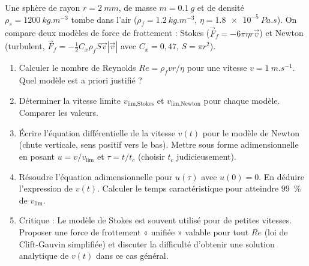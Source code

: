\documentclass[11pt]{article}
\begin{document}
\begin{exercice}
Une sphère de rayon $r = \SI{2}{mm}$, de masse $m = \SI{0,1}{g}$ et de densité $\rho_s = \SI{1200}{kg.m^{-3}}$ tombe dans l'air ($\rho_f = \SI{1,2}{kg.m^{-3}}$, $\eta = \SI{1,8e-5}{Pa.s}$). On compare deux modèles de force de frottement : Stokes ($\vec{F}_f = -6\pi\eta r \vec{v}$) et Newton (turbulent, $\vec{F}_f = -\frac{1}{2}C_x \rho_f S \vec{v}|\vec{v}|$ avec $C_x=0,47$, $S=\pi r^2$).
\begin{enumerate}
    \item Calculer le nombre de Reynolds $Re = \rho_f v r / \eta$ pour une vitesse $v = \SI{1}{m.s^{-1}}$. Quel modèle est a priori justifié ?
    \item Déterminer la vitesse limite $v_{\text{lim,Stokes}}$ et $v_{\text{lim,Newton}}$ pour chaque modèle. Comparer les valeurs.
    \item Écrire l'équation différentielle de la vitesse $v(t)$ pour le modèle de Newton (chute verticale, sens positif vers le bas). Mettre sous forme adimensionnelle en posant $u = v/v_{\text{lim}}$ et $\tau = t/t_c$ (choisir $t_c$ judicieusement).
    \item Résoudre l'équation adimensionnelle pour $u(\tau)$ avec $u(0)=0$. En déduire l'expression de $v(t)$. Calculer le temps caractéristique pour atteindre \SI{99}{\%} de $v_{\text{lim}}$.
    \item Critique : Le modèle de Stokes est souvent utilisé pour de petites vitesses. Proposer une force de frottement « unifiée » valable pour tout $Re$ (loi de Clift-Gauvin simplifiée) et discuter la difficulté d'obtenir une solution analytique de $v(t)$ dans ce cas général.
\end{enumerate}
\end{exercice}
\end{document}
